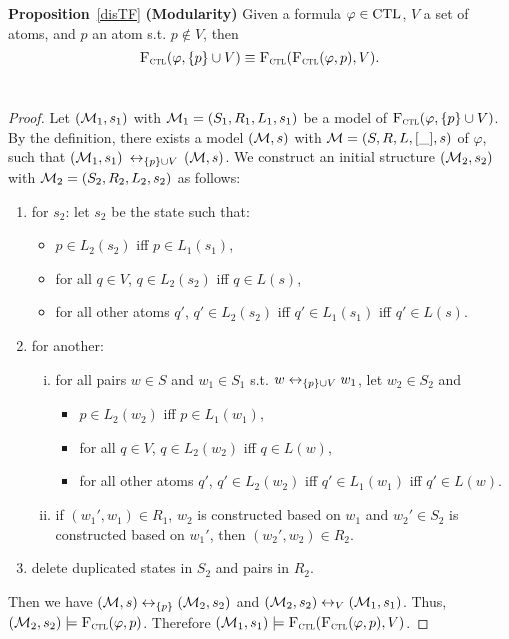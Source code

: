 \documentclass[twoside,11pt]{article}
\begin{document}
	
	
	
	
	\noindent\textbf{Proposition}~\ref{disTF} \textbf{(Modularity)}
	Given a formula $\varphi \in \textrm{CTL}$, $V$ a set of atoms, and $p$ an atom s.t. $p \notin V$, then
	\[
	{\textsc{F}_{\textsc{ctl}}}(\varphi, \{p\} \cup V) \equiv {\textsc{F}_{\textsc{ctl}}}({\textsc{F}_{\textsc{ctl}}}(\varphi, p), V).
	\]\\
	\begin{proof}
		Let $({\cal M}_1, s_1) $ with ${\cal M}_1=(S_1, R_1, L_1,s_1)$ be a model of ${\textsc{F}_{\textsc{ctl}}}(\varphi, \{p\} \cup V)$. By the definition, there exists a model $({\cal M},s)$ with ${\cal M} = (S, R,L,[\_],s)$ of $\varphi$, such that $({\cal M}_1, s_1)$ $\leftrightarrow_{\{p\} \cup V}$ $({\cal M}, s)$. We construct an initial structure $({\cal M}_2, s_2)$ with ${\cal M}_2 = (S_2, R_2, L_2,s_2)$ as follows:
		\begin{enumerate}[(1)]
			\item for $s_2$: let $s_2$ be the state such that:
			\begin{itemize}
				\item $p \in L_2(s_2)$ iff $p \in L_1(s_1)$,
				\item for all $q \in V$, $q \in L_2(s_2)$ iff $q\in L(s)$,
				\item for all other atoms $q'$, $q' \in L_2(s_2)$ iff $q' \in L_1(s_1)$ iff $q'\in L(s)$.
			\end{itemize}
			\item for another:
			\begin{enumerate}[(i)]
				\item for all pairs  $w \in S$ and $w_1 \in S_1$ s.t. $w \leftrightarrow_{\{p\} \cup V} w_1$, let $w_2 \in S_2$ and
				\begin{itemize}
					\item $p \in L_2(w_2)$ iff $p \in L_1(w_1)$,
					\item for all $q \in V$, $q \in L_2(w_2)$ iff $q\in L(w)$,
					\item for all other atoms $q'$, $q' \in L_2(w_2)$ iff $q' \in L_1(w_1)$ iff $q'\in L(w)$.
				\end{itemize}
				\item if $(w_1', w_1)\in R_1$, $w_2$ is constructed based on $w_1$ and $w_2'\in S_2$ is constructed based on $w_1'$, then $(w_2', w_2)\in R_2$.
			\end{enumerate}
			\item delete duplicated states in $S_2$ and pairs in $R_2$.
		\end{enumerate}
		Then we have $({\cal M}, s) \leftrightarrow_{\{p\}} ({\cal M}_2, s_2)$ and $({\cal M}_2, s_2) \leftrightarrow_V ({\cal M}_1, s_1)$. Thus, $({\cal M}_2, s_2) \models {\textsc{F}_{\textsc{ctl}}}(\varphi, p)$. Therefore $({\cal M}_1, s_1) \models {\textsc{F}_{\textsc{ctl}}}({\textsc{F}_{\textsc{ctl}}}(\varphi, p), V)$.
		

\end{proof}
\end{document}
